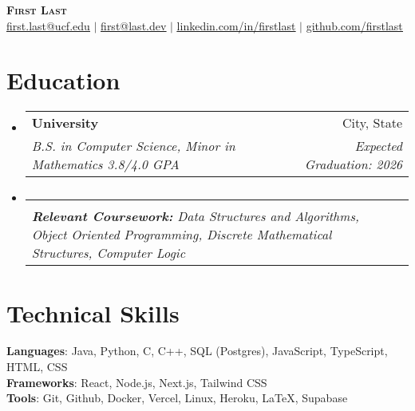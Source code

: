 \documentclass[letterpaper,11pt]{article}
\makeatletter
\newcommand{\resumeSubheading}[4]{
  \vspace{-2pt}\item
    \begin{tabular*}{0.97\textwidth}[t]{l@{\extracolsep{\fill}}r}
      \textbf{#1} & #2 \\
      \textit{\small#3} & \textit{\small #4} \\
    \end{tabular*}\vspace{-7pt}
}
\newcommand{\resumeSubHeadingListStart}{\begin{itemize}[leftmargin=0.15in, label={}]}
\newcommand{\resumeSubHeadingListEnd}{\end{itemize}}
\makeatother
\begin{document}

\begin{center}
    \textbf{\Huge \scshape First Last} \\ \vspace{1pt}
    \href{mailto:first.last@ucf.edu}{\underline{first.last@ucf.edu}} $|$ \href{mailto:first@last.dev}{\underline{first@last.dev}} $|$ 
    \href{https://linkedin.com/in/firstlast}{\underline{linkedin.com/in/firstlast}} $|$
    \href{https://github.com/firstlast}{\underline{github.com/firstlast}}
\end{center}


\section{Education}
  \resumeSubHeadingListStart
    \resumeSubheading
      {University}{City, State}
      {B.S. in Computer Science, Minor in Mathematics 3.8/4.0 GPA}{Expected Graduation: 2026}
    
      \vspace{-15pt}
    \resumeSubheading
      {}{}
      {\scriptsize{\textbf{Relevant Coursework: }Data Structures and Algorithms, Object Oriented Programming, Discrete Mathematical Structures, Computer Logic}}{}
  \resumeSubHeadingListEnd


\section{Technical Skills}
 \begin{itemize}[leftmargin=0.15in, label={}]
    \small{\item{
     \textbf{Languages}{: Java, Python, C, C++, SQL (Postgres), JavaScript, TypeScript, HTML, CSS} \\
     \textbf{Frameworks}{: React, Node.js, Next.js, Tailwind CSS} \\
     \textbf{Tools}{: Git, Github, Docker, Vercel, Linux, Heroku, LaTeX, Supabase} \\
    }}
 \end{itemize}
\end{document}
